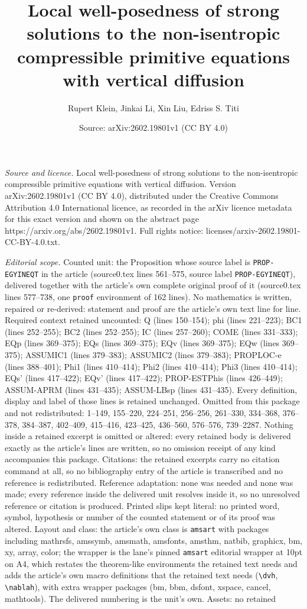 \documentclass[10pt,a4paper]{amsart}
\title[Local well-posedness of strong solutions to the non-isentrop]{Local well-posedness of strong solutions to the non-isentropic compressible primitive equations with vertical diffusion}
\author{Rupert Klein, Jinkai Li, Xin Liu, Edriss S. Titi}
\date{Source: arXiv:2602.19801v1 (CC BY 4.0)}
\begin{document}
\maketitle

\noindent\emph{Source and licence.} Local well-posedness of strong solutions to the non-isentropic compressible primitive equations with vertical diffusion. Version arXiv:2602.19801v1 (CC BY 4.0), distributed under the Creative Commons Attribution 4.0 International licence, as recorded in the arXiv licence metadata for this exact version and shown on the abstract page https://arxiv.org/abs/2602.19801v1. Full rights notice: licenses/arxiv-2602.19801-CC-BY-4.0.txt.\par\smallskip

\noindent\textit{Editorial scope.} Counted unit: the Proposition whose source label is \texttt{PROP-EGYINEQT} in the article (source0.tex lines 561--575, source label \texttt{PROP-EGYINEQT}), delivered together with the article's own complete original proof of it (source0.tex lines 577--738, one \texttt{proof} environment of 162 lines). No mathematics is written, repaired or re-derived: statement and proof are the article's own text line for line. Required context retained uncounted: Q (lines 150--154); phi (lines 221--223); BC1 (lines 252--255); BC2 (lines 252--255); IC (lines 257--260); COME (lines 331--333); EQp (lines 369--375); EQs (lines 369--375); EQv (lines 369--375); EQw (lines 369--375); ASSUMIC1 (lines 379--383); ASSUMIC2 (lines 379--383); PROPLOC-e (lines 388--401); Phi1 (lines 410--414); Phi2 (lines 410--414); Phi3 (lines 410--414); EQs' (lines 417--422); EQv' (lines 417--422); PROP-ESTPhis (lines 426--449); ASSUM-APRM (lines 431--435); ASSUM-LBsp (lines 431--435). Every definition, display and label of those lines is retained unchanged. Omitted from this package and not redistributed: 1--149, 155--220, 224--251, 256--256, 261--330, 334--368, 376--378, 384--387, 402--409, 415--416, 423--425, 436--560, 576--576, 739--2287. Nothing inside a retained excerpt is omitted or altered: every retained body is delivered exactly as the article's lines are written, so no omission receipt of any kind accompanies this package. Citations: the retained excerpts carry no citation command at all, so no bibliography entry of the article is transcribed and no reference is redistributed. Reference adaptation: none was needed and none was made; every reference inside the delivered unit resolves inside it, so no unresolved reference or citation is produced. Printed slips kept literal: no printed word, symbol, hypothesis or number of the counted statement or of its proof was altered. Layout and class: the article's own class is \texttt{amsart} with packages including mathrsfs, amssymb, amsmath, amsfonts, amsthm, natbib, graphicx, bm, xy, array, color; the wrapper is the lane's pinned \texttt{amsart} editorial wrapper at 10pt on A4, which restates the theorem-like environments the retained text needs and adds the article's own macro definitions that the retained text needs (\texttt{\textbackslash dvh}, \texttt{\textbackslash nablah}), with extra wrapper packages (bm, bbm, dsfont, xspace, cancel, mathtools). The delivered numbering is the unit's own. Assets: no retained 
\end{document}
